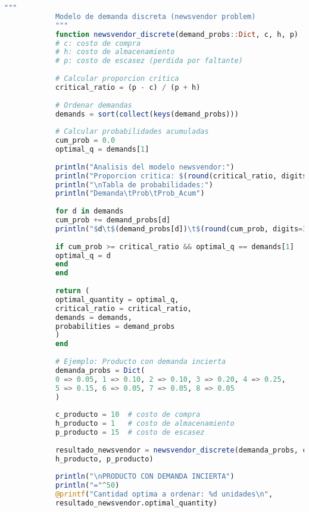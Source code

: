 \documentclass[12pt,a4paper]{book}
\begin{document}
	\begin{tcolorbox}[enhanced,colback=naranjaclaro,colframe=naranjaacento,boxrule=3pt,arc=12pt,
		drop shadow,title={\Large\bfseries\color{white} \faChartLine\ MODELOS PROBABIL\'ISTICOS},breakable]
		
		\begin{lstlisting}[language=Julia,basicstyle=\footnotesize\ttfamily]
			"""
			Modelo de demanda discreta (newsvendor problem)
			"""
			function newsvendor_discrete(demand_probs::Dict, c, h, p)
			# c: costo de compra
			# h: costo de almacenamiento 
			# p: costo de escasez (perdida por faltante)
			
			# Calcular proporcion critica
			critical_ratio = (p - c) / (p + h)
			
			# Ordenar demandas
			demands = sort(collect(keys(demand_probs)))
			
			# Calcular probabilidades acumuladas
			cum_prob = 0.0
			optimal_q = demands[1]
			
			println("Analisis del modelo newsvendor:")
			println("Proporcion critica: $(round(critical_ratio, digits=4))")
			println("\nTabla de probabilidades:")
			println("Demanda\tProb\tProb_Acum")
			
			for d in demands
			cum_prob += demand_probs[d]
			println("$d\t$(demand_probs[d])\t$(round(cum_prob, digits=3))")
			
			if cum_prob >= critical_ratio && optimal_q == demands[1]
			optimal_q = d
			end
			end
			
			return (
			optimal_quantity = optimal_q,
			critical_ratio = critical_ratio,
			demands = demands,
			probabilities = demand_probs
			)
			end
			
			# Ejemplo: Producto con demanda incierta
			demanda_probs = Dict(
			0 => 0.05, 1 => 0.10, 2 => 0.10, 3 => 0.20, 4 => 0.25,
			5 => 0.15, 6 => 0.05, 7 => 0.05, 8 => 0.05
			)
			
			c_producto = 10  # costo de compra
			h_producto = 1   # costo de almacenamiento
			p_producto = 15  # costo de escasez
			
			resultado_newsvendor = newsvendor_discrete(demanda_probs, c_producto, 
			h_producto, p_producto)
			
			println("\nPRODUCTO CON DEMANDA INCIERTA")
			println("="^50)
			@printf("Cantidad optima a ordenar: %d unidades\n", 
			resultado_newsvendor.optimal_quantity)
		\end{lstlisting}
		
	\end{tcolorbox}
	
\end{document}
